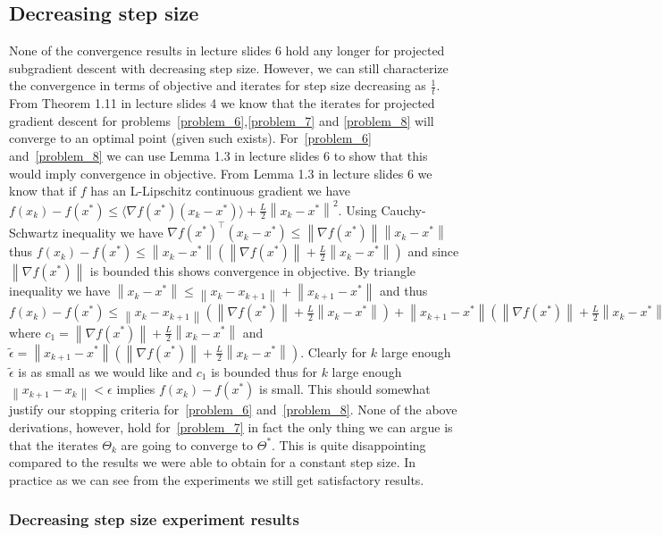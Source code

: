 \documentclass{article}
\newcommand{\0}{\mathrm{0}}
\newcommand{\1}{\mathrm{1}}
\newcommand{\norm}[1]{\left\| #1 \right\|}
\begin{document}
\subsection{Decreasing step size}
None of the convergence results in lecture slides 6 hold any longer for projected subgradient descent with decreasing step size. However, we can still characterize the convergence in terms of objective and iterates for step size decreasing as $\frac{1}{t}$. From Theorem 1.11 in lecture slides 4 we know that the iterates for projected gradient descent for problems~\ref{problem_6},\ref{problem_7} and \ref{problem_8} will converge to an optimal point (given such exists). For~\ref{problem_6} and~\ref{problem_8} we can use Lemma 1.3 in lecture slides 6 to show that this would imply convergence in objective. From Lemma 1.3 in lecture slides 6 we know that if $f$ has an L-Lipschitz continuous gradient we have $f(x_k) - f(x^*) \leq \langle\nabla f(x^*)(x_k-x^*)\rangle + \frac{L}{2}\norm{x_k-x^*}^2$. Using Cauchy-Schwartz inequality we have $\nabla f(x^*)^\top (x_k-x^*) \leq \norm{\nabla f(x^*)}\norm{x_k-x^*}$ thus $f(x_k) - f(x^*) \leq \norm{x_k-x^*}\left(\norm{\nabla f(x^*)} + \frac{L}{2}\norm{x_k-x^*}\right)$ and since $\norm{\nabla f(x^*)}$ is bounded this shows convergence in objective. By triangle inequality we have $\norm{x_k-x^*} \leq \norm{x_k-x_{k+1}} + \norm{x_{k+1} - x^*}$ and thus $f(x_k) - f(x^*) \leq \norm{x_k-x_{k+1}}(\norm{\nabla f(x^*)} + \frac{L}{2}\norm{x_k-x^*}) + \norm{x_{k+1}-x^*}\left(\norm{\nabla f(x^*)} + \frac{L}{2}\norm{x_k-x^*}\right) \leq \norm{x_k-x_{k+1}}c_1 + \tilde{\epsilon}$ where $c_1 = \norm{\nabla f(x^*)}  + \frac{L}{2}\norm{x_k-x^*}$ and $\tilde{\epsilon} = \norm{x_{k+1}-x^*}\left(\norm{\nabla f(x^*)} + \frac{L}{2}\norm{x_k-x^*}\right)$. Clearly for $k$ large enough $\tilde{\epsilon}$ is as small as we would like and $c_1$ is bounded thus for $k$ large enough $\norm{x_{k+1} - x_k} < \epsilon$ implies $f(x_k) - f(x^*)$ is small. This should somewhat justify our stopping criteria for~\ref{problem_6} and~\ref{problem_8}. None of the above derivations, however, hold for~\ref{problem_7} in fact the only thing we can argue is that the iterates $\Theta_k$ are going to converge to $\Theta^*$. This is quite disappointing compared to the results we were able to obtain for a constant step size. In practice as we can see from the experiments we still get satisfactory results.

\subsubsection{Decreasing step size experiment results}
\end{document}
